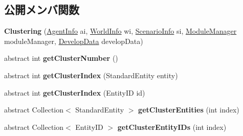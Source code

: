 \subsection*{公開メンバ関数}
\begin{DoxyCompactItemize}
\item 
\hypertarget{classadf_1_1component_1_1module_1_1algorithm_1_1Clustering_aa1dcf3e542dafd76e7a60937d5ef1a65}{}\label{classadf_1_1component_1_1module_1_1algorithm_1_1Clustering_aa1dcf3e542dafd76e7a60937d5ef1a65} 
{\bfseries Clustering} (\hyperlink{classadf_1_1agent_1_1info_1_1AgentInfo}{Agent\+Info} ai, \hyperlink{classadf_1_1agent_1_1info_1_1WorldInfo}{World\+Info} wi, \hyperlink{classadf_1_1agent_1_1info_1_1ScenarioInfo}{Scenario\+Info} si, \hyperlink{classadf_1_1agent_1_1module_1_1ModuleManager}{Module\+Manager} module\+Manager, \hyperlink{classadf_1_1agent_1_1develop_1_1DevelopData}{Develop\+Data} develop\+Data)
\item 
\hypertarget{classadf_1_1component_1_1module_1_1algorithm_1_1Clustering_a11645f349c9d8b3b36a5bd0ef32c8759}{}\label{classadf_1_1component_1_1module_1_1algorithm_1_1Clustering_a11645f349c9d8b3b36a5bd0ef32c8759} 
abstract int {\bfseries get\+Cluster\+Number} ()
\item 
\hypertarget{classadf_1_1component_1_1module_1_1algorithm_1_1Clustering_a95e78c67ee2faf449f268d3de54356ed}{}\label{classadf_1_1component_1_1module_1_1algorithm_1_1Clustering_a95e78c67ee2faf449f268d3de54356ed} 
abstract int {\bfseries get\+Cluster\+Index} (Standard\+Entity entity)
\item 
\hypertarget{classadf_1_1component_1_1module_1_1algorithm_1_1Clustering_adf11ac7549acf8c5f6f5b8ce940b7a29}{}\label{classadf_1_1component_1_1module_1_1algorithm_1_1Clustering_adf11ac7549acf8c5f6f5b8ce940b7a29} 
abstract int {\bfseries get\+Cluster\+Index} (Entity\+ID id)
\item 
\hypertarget{classadf_1_1component_1_1module_1_1algorithm_1_1Clustering_a48736807ea1eb28cea5537b9cd92c432}{}\label{classadf_1_1component_1_1module_1_1algorithm_1_1Clustering_a48736807ea1eb28cea5537b9cd92c432} 
abstract Collection$<$ Standard\+Entity $>$ {\bfseries get\+Cluster\+Entities} (int index)
\item 
\hypertarget{classadf_1_1component_1_1module_1_1algorithm_1_1Clustering_a8b93e3382f702875cb9d0380bc5fa082}{}\label{classadf_1_1component_1_1module_1_1algorithm_1_1Clustering_a8b93e3382f702875cb9d0380bc5fa082} 
abstract Collection$<$ Entity\+ID $>$ {\bfseries get\+Cluster\+Entity\+I\+Ds} (int index)
\item 

\end{DoxyCompactItemize}
